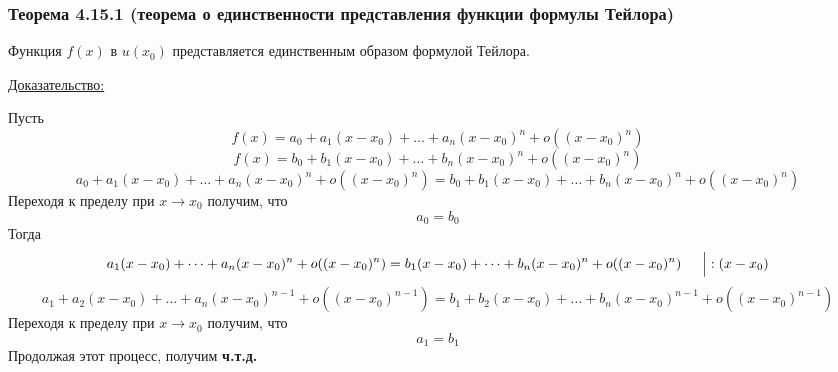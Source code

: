 \documentclass[12pt]{article}
\begin{document}
    \subsubsection*{Теорема 4.15.1 (теорема о единственности представления функции формулы Тейлора)}\label{th:4.15.1}
    Функция $f(x)$ в $u(x_0)$ представляется единственным образом формулой Тейлора.\par\noindent
    \noindent\underline{Доказательство:}
    \begin{adjustwidth}{1.5em}{1.5em}
        Пусть
        \[ f(x) = a_0 + a_1(x-x_0) + \dots + a_n(x - x_0)^n + o((x-x_0)^n) \]
        \[ f(x) = b_0 + b_1(x-x_0) + \dots + b_n(x - x_0)^n + o((x-x_0)^n) \]
        \[ a_0 + a_1(x-x_0) + \dots + a_n(x - x_0)^n + o((x-x_0)^n) = b_0 + b_1(x-x_0) + \dots + b_n(x - x_0)^n + o((x-x_0)^n) \]
        Переходя к пределу при $x \to x_0$ получим, что
        \[ a_0 = b_0 \]
        Тогда 
        \[ a_1(x-x_0) + \dots + a_n(x-x_0)^n + o((x-x_0)^n) = b_1(x-x_0) + \dots + b_n(x - x_0)^n + o((x-x_0)^n) \indent \Big| : (x - x_0) \]
        \[ a_1 + a_2(x-x_0) + \dots + a_n(x-x_0)^{n-1} + o((x-x_0)^{n-1}) = b_1 + b_2(x-x_0) + \dots + b_n(x - x_0)^{n-1} + o((x-x_0)^{n-1})\]
        Переходя к пределу при $x \to x_0$ получим, что
        \[ a_1 = b_1 \]
        Продолжая этот процесс, получим \textbf{ч.т.д.}
    \end{adjustwidth}
    
\end{document}
